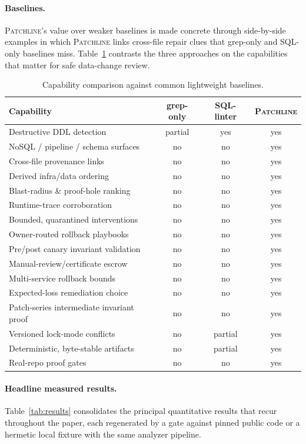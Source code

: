 \documentclass[11pt]{article}
\newcommand{\tool}{\textsc{Patchline}}
\begin{document}
\paragraph{Baselines.} \tool's value over weaker baselines is made concrete through side-by-side
examples in which \tool{} links cross-file repair clues that grep-only and SQL-only baselines miss.
Table~\ref{tab:baselines} contrasts the three approaches on the capabilities that matter for safe
data-change review.

\begin{table}[h]\centering\small
\caption{Capability comparison against common lightweight baselines.}
\label{tab:baselines}
\begin{tabular}{>{\raggedright\arraybackslash}p{5.4cm}ccc}
\toprule
\textbf{Capability} & \textbf{grep-only} & \textbf{SQL-linter} & \textbf{\tool} \\
\midrule
Destructive DDL detection & partial & yes & yes \\
NoSQL / pipeline / schema surfaces & no & no & yes \\
Cross-file provenance links & no & no & yes \\
Derived infra/data ordering & no & no & yes \\
Blast-radius \& proof-hole ranking & no & no & yes \\
Runtime-trace corroboration & no & no & yes \\
Bounded, quarantined interventions & no & no & yes \\
Owner-routed rollback playbooks & no & no & yes \\
Pre/post canary invariant validation & no & no & yes \\
Manual-review/certificate escrow & no & no & yes \\
Multi-service rollback bounds & no & no & yes \\
Expected-loss remediation choice & no & no & yes \\
Patch-series intermediate invariant proof & no & no & yes \\
Versioned lock-mode conflicts & no & partial & yes \\
Deterministic, byte-stable artifacts & no & partial & yes \\
Real-repo proof gates & no & no & yes \\
\bottomrule
\end{tabular}
\end{table}

\paragraph{Headline measured results.} Table~\ref{tab:results} consolidates the principal quantitative
results that recur throughout the paper, each regenerated by a gate against pinned public code or a
hermetic local fixture with the same analyzer pipeline.
\end{document}
